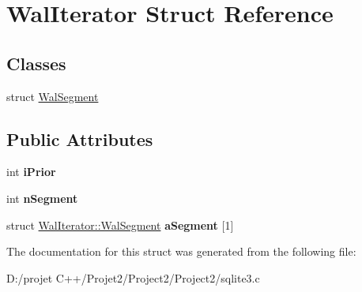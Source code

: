 \hypertarget{struct_wal_iterator}{}\section{Wal\+Iterator Struct Reference}
\label{struct_wal_iterator}
\subsection*{Classes}
\begin{DoxyCompactItemize}
\item 
struct \mbox{\hyperlink{struct_wal_iterator_1_1_wal_segment}{Wal\+Segment}}
\end{DoxyCompactItemize}
\subsection*{Public Attributes}
\begin{DoxyCompactItemize}
\item 
\mbox{\label{struct_wal_iterator_a2f906125490dd3e967fc53768b03abbb}} 
int {\bfseries i\+Prior}
\item 
\mbox{\label{struct_wal_iterator_ad81bc9447d6043212289d127dc9fdafa}} 
int {\bfseries n\+Segment}
\item 
\mbox{\label{struct_wal_iterator_a6d3fcaaeeca5a0eee46f9fa7c3cb669b}} 
struct \mbox{\hyperlink{struct_wal_iterator_1_1_wal_segment}{Wal\+Iterator\+::\+Wal\+Segment}} {\bfseries a\+Segment} \mbox{[}1\mbox{]}
\end{DoxyCompactItemize}


The documentation for this struct was generated from the following file\+:\begin{DoxyCompactItemize}
\item 
D\+:/projet C++/\+Projet2/\+Project2/\+Project2/sqlite3.\+c\end{DoxyCompactItemize}
